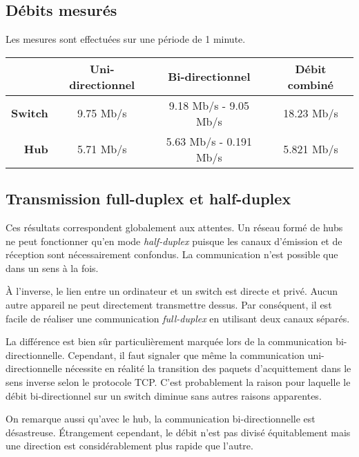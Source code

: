 \documentclass[11pt,a4paper]{article}
\begin{document}
\subsection{Débits mesurés}

Les mesures sont effectuées sur une période de 1 minute.

\begin{tabular}{|r|c||c|c|}
	\hline
	& \textbf{Uni-directionnel} & \textbf{Bi-directionnel}  & \textbf{Débit combiné}\\
	\hline
	\textbf{Switch} & 9.75 Mb/s & 9.18 Mb/s - 9.05 Mb/s & 18.23 Mb/s \\
	\textbf{Hub} & 5.71 Mb/s & 5.63 Mb/s - 0.191  Mb/s & 5.821 Mb/s \\
	\hline
\end{tabular}

\subsection{Transmission full-duplex et half-duplex}

Ces résultats correspondent globalement aux attentes. Un réseau formé de hubs ne peut fonctionner qu'en mode \textit{half-duplex} puisque les canaux d'émission et de réception sont nécessairement confondus. La communication n'est possible que dans un sens à la fois.

À l'inverse, le lien entre un ordinateur et un switch est directe et privé. Aucun autre appareil ne peut directement transmettre dessus. Par conséquent, il est facile de réaliser une communication \textit{full-duplex} en utilisant deux canaux séparés.

La différence est bien sûr particulièrement marquée lors de la communication bi-directionnelle. Cependant, il faut signaler que même la communication uni-directionnelle nécessite en réalité la transition des paquets d'acquittement dans le sens inverse selon le protocole TCP. C'est probablement la raison pour laquelle le débit bi-directionnel sur un switch diminue sans autres raisons apparentes.

On remarque aussi qu'avec le hub, la communication bi-directionnelle est désastreuse. Étrangement cependant, le débit n'est pas divisé équitablement mais une direction est considérablement plus rapide que l'autre.
\end{document}
